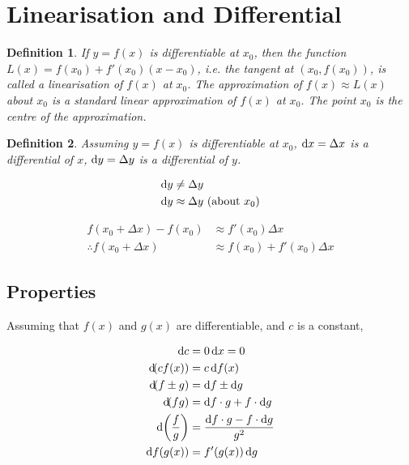 \documentclass[fleqn]{article}
\newtheorem{definition}{Definition}
\begin{document}
\section{Linearisation and Differential}

\begin{definition}
	If $y = f(x)$ is differentiable at $x_0$, then the function $L(x) = f(x_0) + f'(x_0)(x-x_0)$, i.e. the tangent at $(x_0, f(x_0))$, is called a \emph{linearisation} of $f(x)$ at $x_0$. The approximation of $f(x) \approx L(x)$ about $x_0$ is a \emph{standard linear approximation} of $f(x)$ at $x_0$. The point $x_0$ is the \emph{centre of the approximation}. 
\end{definition}

\begin{definition}
	Assuming $y = f(x)$ is differentiable at $x_0$, $\dif x = \Delta x$ is a \emph{differential of $x$}, $\dif y = \Delta y$ is a \emph{differential of $y$}.
\end{definition}

%	

\begin{align*}
	\dif y &\neq \Delta y \\
	\dif y &\approx \Delta y \text{ (about $x_0$)}
\end{align*}

\begin{align*}
	f(x_0 + \Delta x) - f(x_0) &\approx f'(x_0) \Delta x \\
	\therefore f(x_0 + \Delta x) &\approx f(x_0) + f'(x_0) \Delta x
\end{align*}

\subsection{Properties}

Assuming that $f(x)$ and $g(x)$ are differentiable, and $c$ is a constant, 

\begin{align*}
	\dif c &= 0 \dif x = 0 \\
	\dif (c f(x)) &= c \dif f(x) \\
	\dif (f \pm g) &= \dif f \pm \dif g \\
	\dif (fg) &= \dif f \cdot g + f \cdot \dif g \\
	\dif \left(\dfrac{f}{g}\right) &= \dfrac{\dif f \cdot g - f \cdot \dif g}{g^2} \\
	\dif f(g(x)) &= f'(g(x)) \dif g
\end{align*}
\end{document}
